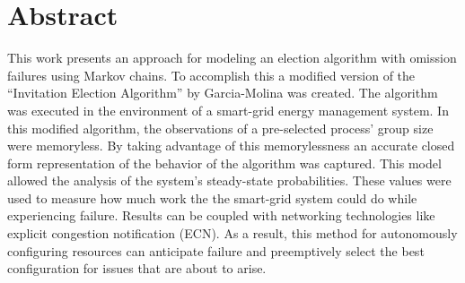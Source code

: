 \section{Abstract}

This work presents an approach for modeling an election algorithm with omission failures using Markov chains.
To accomplish this a modified version of the ``Invitation Election Algorithm'' by Garcia-Molina was created.
The algorithm was executed in the environment of a smart-grid energy management system.
In this modified algorithm, the observations of a pre-selected process' group size were memoryless.
By taking advantage of this memorylessness an accurate closed form representation of the behavior of the algorithm was captured.
This model allowed the analysis of the system's steady-state probabilities.
These values were used to measure how much work the the smart-grid system could do while experiencing failure.
Results can be coupled with networking technologies like explicit congestion notification (ECN).
As a result, this method for autonomously configuring resources can anticipate failure and preemptively select the best configuration for issues that are about to arise.

